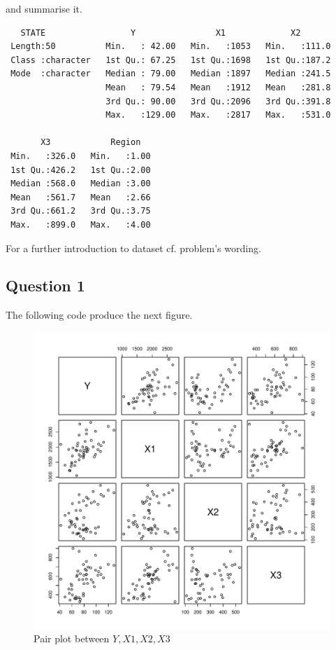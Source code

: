 \documentclass[12pt,letterpaper]{article}
\begin{document}
and summarise it.

  



\begin{verbatim}
   STATE                 Y                X1             X2       
 Length:50          Min.   : 42.00   Min.   :1053   Min.   :111.0  
 Class :character   1st Qu.: 67.25   1st Qu.:1698   1st Qu.:187.2  
 Mode  :character   Median : 79.00   Median :1897   Median :241.5  
                    Mean   : 79.54   Mean   :1912   Mean   :281.8  
                    3rd Qu.: 90.00   3rd Qu.:2096   3rd Qu.:391.8  
                    Max.   :129.00   Max.   :2817   Max.   :531.0
  
       X3            Region    
 Min.   :326.0   Min.   :1.00  
 1st Qu.:426.2   1st Qu.:2.00  
 Median :568.0   Median :3.00  
 Mean   :561.7   Mean   :2.66  
 3rd Qu.:661.2   3rd Qu.:3.75  
 Max.   :899.0   Max.   :4.00  
\end{verbatim}
For a further introduction to dataset cf. problem's wording.

\subsection*{Question 1}
The following code produce the next figure.\\

  

\begin{figure}[h!]\centering
	\caption{\footnotesize Pair plot between $Y,X1,X2,X3$ }
	\label{fig:plot_0}
	\includegraphics[width=.85\textwidth]{pairs.pdf}
\end{figure}
\end{document}
